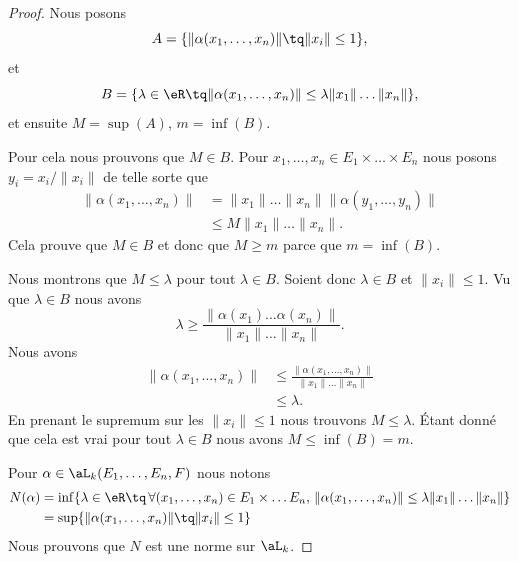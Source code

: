 \begin{proof}
	Nous posons
	\begin{equation}
		A=\{ \| \alpha(x_1,\ldots,x_n)\| \tq \| x_i \| \leq 1 \},
	\end{equation}
	et
	\begin{equation}
		B=\{ \lambda\in \eR\tq \| \alpha(x_1,\ldots,x_n) \|\leq \lambda\| x_1 \|\ldots \| x_n \| \},
	\end{equation}
	et ensuite \( M=\sup(A)\), \( m=\inf(B)\).

	\spitem[\( m\leq M\)]
	Pour cela nous prouvons que \( M\in B\). Pour \( x_1,\ldots,x_n\in E_1\times\ldots\times E_n\) nous posons \( y_i=x_i/\| x_i \|\) de telle sorte que
	\begin{subequations}
		\begin{align}
			\| \alpha(x_1,\ldots,x_n) \| & =\| x_1 \|\ldots\| x_n \|\| \alpha(y_1,\ldots,y_n) \| \\
			                             & \leq M\| x_1 \|\ldots \| x_n \|.
		\end{align}
	\end{subequations}
	Cela prouve que \( M\in B\) et donc que \( M\geq m\) parce que \( m=\inf(B)\).

	\spitem[\( M\leq m\)]
	Nous montrons que \( M\leq \lambda\) pour tout \( \lambda\in B\). Soient donc \( \lambda\in B\) et \( \| x_i \|\leq 1\). Vu que \( \lambda\in B\) nous avons
	\begin{equation}
		\lambda\geq \frac{ \| \alpha(x_1)\ldots \alpha(x_n) \| }{ \| x_1 \|\ldots \| x_n \| }.
	\end{equation}
	Nous avons
	\begin{subequations}
		\begin{align}
			\| \alpha(x_1,\ldots,x_n) \| & \leq \frac{ \| \alpha(x_1,\ldots,x_n) \| }{ \| x_1 \|\ldots \| x_n \| } \\
			                             & \leq \lambda.
		\end{align}
	\end{subequations}
	En prenant le supremum sur les \( \| x_i \|\leq 1\) nous trouvons \( M\leq \lambda\). Étant donné que cela est vrai pour tout \( \lambda\in B\) nous avons \( M\leq \inf(B)=m\).

	Pour \( \alpha\in \aL_k(E_1,\ldots,E_n,F)\) nous notons
	\begin{subequations}
		\begin{align}
			N(\alpha) & = \inf\{ \lambda\in \eR\tq\,\forall (x_1,\ldots,x_n)\in E_1\times \ldots E_n,\, \| \alpha(x_1,\ldots,x_n) \|\leq \lambda \| x_1 \|\ldots\| x_n \| \} \\
			          & =\sup\{ \| \alpha(x_1,\ldots,x_n) \|\tq\| x_i \|\leq 1 \}
		\end{align}
	\end{subequations}
	Nous prouvons que \( N\) est une norme sur \( \aL_k\).


\end{proof}
